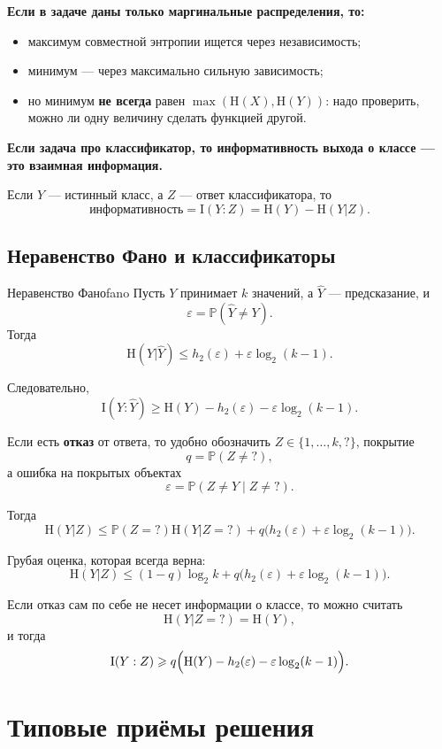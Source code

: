 \documentclass[12pt,a4paper]{article}
\renewcommand{\ge}{\geqslant}
\renewcommand{\le}{\leqslant}
\newcommand{\HH}{\mathrm{H}}
\newcommand{\II}{\mathrm{I}}
\newcommand{\PP}{\mathbb{P}}
\begin{document}
\textbf{Если в задаче даны только маргинальные распределения, то:}
\begin{itemize}[leftmargin=1.5em]
    \item максимум совместной энтропии ищется через независимость;
    \item минимум --- через максимально сильную зависимость;
    \item но минимум \textbf{не всегда} равен $\max(\HH(X),\HH(Y))$: надо проверить, можно ли одну величину сделать функцией другой.
\end{itemize}

\textbf{Если задача про классификатор, то информативность выхода о классе --- это взаимная информация.}

Если $Y$ --- истинный класс, а $Z$ --- ответ классификатора, то
$$
\text{информативность}=\II(Y:Z)=\HH(Y)-\HH(Y|Z).
$$

\subsection{Неравенство Фано и классификаторы}

\begin{theorem}{Неравенство Фано}{fano}
Пусть $Y$ принимает $k$ значений, а $\widehat{Y}$ --- предсказание, и
$$
\varepsilon=\PP(\widehat{Y}\ne Y).
$$
Тогда
$$
\HH(Y|\widehat{Y})\le h_2(\varepsilon)+\varepsilon\log_2 (k-1).
$$

Следовательно,
$$
\II(Y:\widehat{Y})\ge \HH(Y)-h_2(\varepsilon)-\varepsilon\log_2 (k-1).
$$
\end{theorem}

Если есть \textbf{отказ} от ответа, то удобно обозначить $Z\in \{1,\dots,k,?\}$, покрытие
$$
q=\PP(Z\ne ?),
$$
а ошибка на покрытых объектах
$$
\varepsilon=\PP(Z\ne Y\mid Z\ne ?).
$$

Тогда
$$
\HH(Y|Z)\le \PP(Z=? )\HH(Y|Z=? )+q\bigl(h_2(\varepsilon)+\varepsilon\log_2 (k-1)\bigr).
$$

Грубая оценка, которая всегда верна:
$$
\HH(Y|Z)\le (1-q)\log_2 k+q\bigl(h_2(\varepsilon)+\varepsilon\log_2 (k-1)\bigr).
$$

Если отказ сам по себе не несет информации о классе, то можно считать
$$
\HH(Y|Z=? )=\HH(Y),
$$
и тогда
$$
\II(Y:Z)\ge q\Bigl(\HH(Y)-h_2(\varepsilon)-\varepsilon\log_2 (k-1)\Bigr).
$$

\newpage
\section{Типовые приёмы решения}
\end{document}
